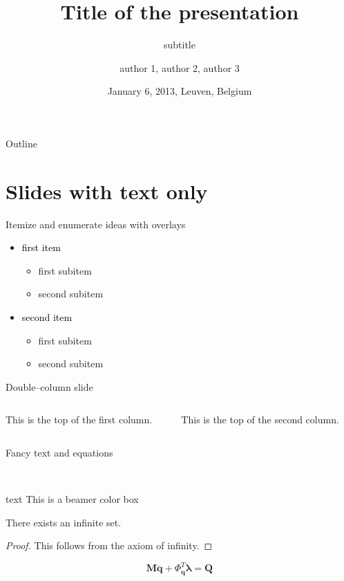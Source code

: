 \documentclass[11pt,t]{beamer}
\title{Title of the presentation}
\author{author 1, author 2, author 3}
\institute{Group, department, KU Leuven}
\subtitle{subtitle}
\date{January 6, 2013, Leuven, Belgium}
\begin{document}
	{
	\begin{frame}
		\titlepage
	\end{frame}
	}
\begin{frame}{Outline}
	\vskip 5mm
	\hfill	{\large \parbox{.95\textwidth}{\tableofcontents[hideallsubsections]}}
\end{frame}

\section{Slides with text only}
\begin{frame}{Itemize and enumerate ideas with overlays}
	\begin{itemize}
		\item \textcolor{black}{first item}
			\begin{itemize}
				\item first subitem
				\item second subitem
			\end{itemize}
		\item \textcolor{black}{second item}
			\begin{itemize}
				\item first subitem
				\item second subitem
			\end{itemize}
	\end{itemize}
\end{frame}
\begin{frame}[t]{Double--column slide}
	\begin{columns}[t]
		\begin{column}{.5\textwidth}
			This is the top of the first column.	
		\end{column}
		\begin{column}{.5\textwidth}
			This is the top of the second column.
		\end{column}
	\end{columns}	
\end{frame}
\begin{frame}{Fancy text and equations}
	\begin{center}~
		\begin{beamercolorbox}[wd=0.4\textwidth,rounded=true,center]{text}
			This is a beamer color box
		\end{beamercolorbox}
	\end{center}
	\begin{theorem}
		There exists an infinite set.
	\end{theorem}
	\begin{proof}
		This follows from the axiom of infinity.
	\end{proof}
	\vspace{4mm}
	\begin{equation}
		\textbf{M} \ddot{\textbf{q}} + \boldsymbol{\mathsf{\Phi}}_{\textbf{q}}^T \boldsymbol\lambda = \textbf{Q}
	\end{equation}
\end{frame}
\end{document}
